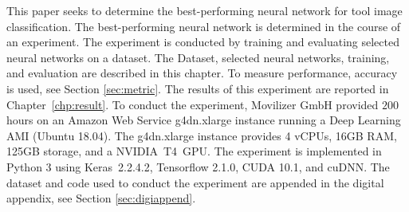 This paper seeks to determine the best-performing neural network for tool image classification. The best-performing neural network is determined in the course of an experiment. The experiment is conducted by training and evaluating selected neural networks on a dataset. The Dataset, selected neural networks, training, and evaluation are described in this chapter. To measure performance, accuracy is used, see Section \ref{sec:metric}. The results of this experiment are reported in Chapter~\ref{chp:result}. To conduct the experiment, Movilizer GmbH provided $200$ hours on an Amazon Web Service g4dn.xlarge instance running a Deep Learning AMI (Ubuntu 18.04).\autocite{AWS.2020a}
The g4dn.xlarge instance provides 4 vCPUs, 16GB RAM, 125GB storage, and a NVIDIA~T4~GPU. \autocite{AWS.2020b} 
The experiment is implemented in Python 3\autocite{Python3} using Keras~2.2.4.2\autocite{Keras}, Tensorflow 2.1.0\autocite{Tensorflow.2015}, CUDA 10.1\autocite{CUDA}, and cuDNN\autocite{cuDNN}. The dataset and code used to conduct the experiment are appended in the digital appendix, see Section \ref{sec:digiappend}.

